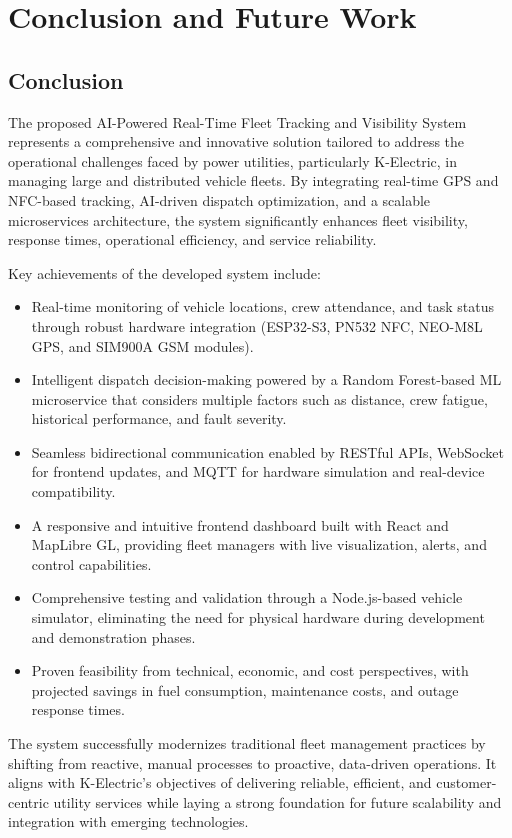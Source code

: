 \chapter{Conclusion and Future Work}

\section{Conclusion}

The proposed AI-Powered Real-Time Fleet Tracking and Visibility System represents a comprehensive and innovative solution tailored to address the operational challenges faced by power utilities, particularly K-Electric, in managing large and distributed vehicle fleets. By integrating real-time GPS and NFC-based tracking, AI-driven dispatch optimization, and a scalable microservices architecture, the system significantly enhances fleet visibility, response times, operational efficiency, and service reliability.

Key achievements of the developed system include:
\begin{itemize}
    \item Real-time monitoring of vehicle locations, crew attendance, and task status through robust hardware integration (ESP32-S3, PN532 NFC, NEO-M8L GPS, and SIM900A GSM modules).
    \item Intelligent dispatch decision-making powered by a Random Forest-based ML microservice that considers multiple factors such as distance, crew fatigue, historical performance, and fault severity.
    \item Seamless bidirectional communication enabled by RESTful APIs, WebSocket for frontend updates, and MQTT for hardware simulation and real-device compatibility.
    \item A responsive and intuitive frontend dashboard built with React and MapLibre GL, providing fleet managers with live visualization, alerts, and control capabilities.
    \item Comprehensive testing and validation through a Node.js-based vehicle simulator, eliminating the need for physical hardware during development and demonstration phases.
    \item Proven feasibility from technical, economic, and cost perspectives, with projected savings in fuel consumption, maintenance costs, and outage response times.
\end{itemize}

The system successfully modernizes traditional fleet management practices by shifting from reactive, manual processes to proactive, data-driven operations. It aligns with K-Electric's objectives of delivering reliable, efficient, and customer-centric utility services while laying a strong foundation for future scalability and integration with emerging technologies.


